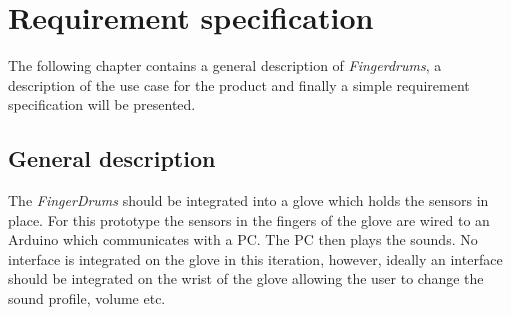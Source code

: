 \chapter{Requirement specification}
\label{kravsspec}
The following chapter contains a general description of \textit{Fingerdrums}, a description of the use case for the product and finally a simple requirement specification will be presented.


\section{General description}
%

The \textit{FingerDrums} should be integrated into a glove which holds the sensors in place. For this prototype the sensors in the fingers of the glove are wired to an Arduino which communicates with a PC. The PC then plays the sounds. No interface is integrated on the glove in this iteration, however, ideally an interface should be integrated on the wrist of the glove allowing the user to change the sound profile, volume etc.


